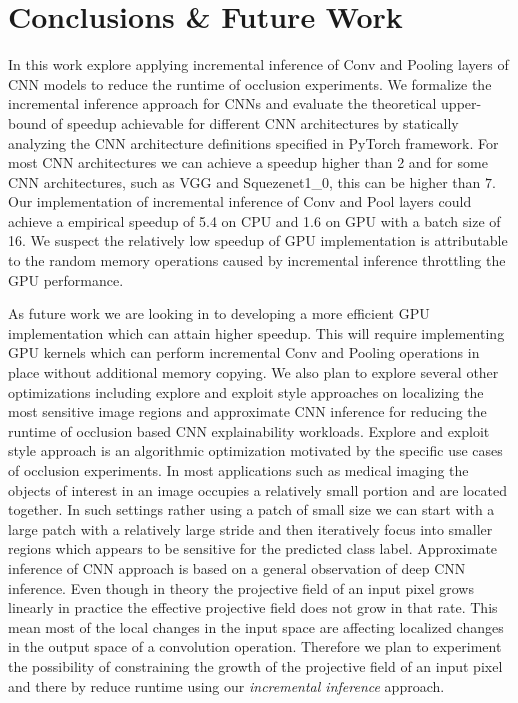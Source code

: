 \section{Conclusions \& Future Work}
In this work explore applying incremental inference of Conv and Pooling layers of CNN models to reduce the runtime of occlusion experiments.
We formalize the incremental inference approach for CNNs and evaluate the theoretical upper-bound of speedup achievable for different CNN architectures by statically analyzing the CNN architecture definitions specified in PyTorch framework.
For most CNN architectures we can achieve a speedup higher than 2 and for some CNN architectures, such as VGG and Squezenet1\_0, this can be higher than $7$.
Our implementation of incremental inference of Conv and Pool layers could achieve a empirical speedup of 5.4 on CPU and 1.6 on GPU with a batch size of 16. We suspect the relatively low speedup of GPU implementation is attributable to the random memory operations caused by incremental inference throttling the GPU performance.

As future work we are looking in to developing a more efficient GPU implementation which can attain higher speedup. This will require implementing GPU kernels which can perform incremental Conv and Pooling operations in place without additional memory copying.
We also plan to explore several other optimizations including explore and exploit style approaches on localizing the most sensitive image regions and approximate CNN inference for reducing the runtime of occlusion based CNN explainability workloads.
Explore and exploit style approach is an algorithmic optimization motivated by the specific use cases of occlusion experiments.
In most applications such as medical imaging the objects of interest in an image occupies a relatively small portion and are located together.
In such settings rather using a patch of small size we can start with a large patch with a relatively large stride and then iteratively focus into smaller regions which appears to be sensitive for the predicted class label.
Approximate inference of CNN approach is based on a general observation of deep CNN inference.
Even though in theory the projective field of an input pixel grows linearly in practice the effective projective field does not grow in that rate.
This mean most of the local changes in the input space are affecting localized changes in the output space of a convolution operation.
Therefore we plan to experiment the possibility of constraining the growth of the projective field of an input pixel and there by reduce runtime using our \textit{incremental inference} approach.
